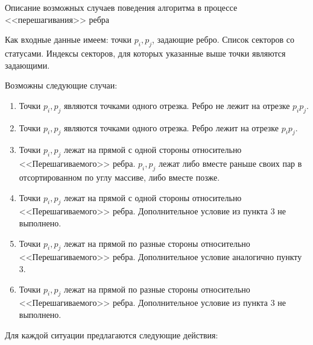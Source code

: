 \documentclass[letterpaper,12pt]{article}
\begin{document}
\begin{center}
Описание возможных случаев поведения алгоритма в процессе <<перешагивания>>
ребра
\end{center}
\par Как входные данные имеем: точки $p_i, p_j$, задающие ребро.
Список секторов со статусами. Индексы секторов, для которых указанные
выше точки являются задающими.
\par Возможны следующие случаи:
\begin{enumerate}
      \item Точки $p_i, p_j$ являются точками одного отрезка. Ребро не
            лежит на отрезке $p_i p_j$.
      \item Точки $p_i, p_j$ являются точками одного отрезка. Ребро
            лежит на отрезке $p_i p_j$.
      \item Точки $p_i, p_j$ лежат на прямой с одной стороны относительно
            <<Перешагиваемого>> ребра. $p_i, p_j$ лежат либо вместе
            раньше своих пар в отсортированном по углу массиве, либо
            вместе позже.
      \item Точки $p_i, p_j$ лежат на прямой с одной стороны относительно
            <<Перешагиваемого>> ребра. Дополнительное условие из пункта 3 
            не выполнено.
      \item Точки $p_i, p_j$ лежат на прямой по разные стороны 
            относительно <<Перешагиваемого>> ребра. Дополнительное
            условие аналогично пункту 3.
      \item Точки $p_i, p_j$ лежат на прямой по разные стороны 
            относительно <<Перешагиваемого>> ребра. Дополнительное условие 
            из пункта 3 не выполнено.
\end{enumerate}
Для каждой ситуации предлагаются следующие действия:
\end{document}
